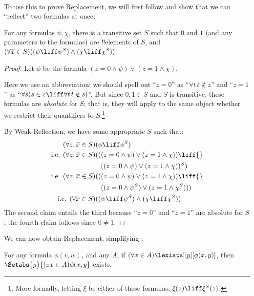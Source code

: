 \documentclass[../../../include/open-logic-section]{subfiles}
\begin{document}
\
\\
To use this to prove Replacement, we will first follow \citet[first
part of Theorem 2]{Levy1960} and show that we can ``reflect'' two
formulas at once:

\begin{lem}[in $\Z + \text{Weak-Reflection}$.]
For any formulas $\psi, \chi$, there is a transitive set $S$ such that $0$ and $1$ (and any parameters to the formulas) are !!{element}s of $S$, and $(\forall \overline{x} \in S)((\psi \liff \psi^S) \land (\chi \liff \chi^S))$.
\end{lem}

\begin{proof}
Let $\phi$ be the formula $(z = 0 \land \psi) \lor (z = 1 \land \chi)$. 

Here we use an abbreviation; we should spell out ``$z = 0$'' as
``$\forall t\, t \notin z$'' and ``$z =1$'' as ``$\forall s(s \in z
\liff \forall t\, t \notin s)$''. But since $0, 1 \in S$ and $S$ is
transitive, these formulas are \emph{absolute} for $S$; that is, they
will apply to the same object whether we restrict their quantifiers to
$S$.\footnote{More formally, letting $\xi$ be either of these
formulas, $\xi(z) \liff \xi^S(z)$.}

By Weak-Reflection, we have some appropriate $S$ such that:
\begin{align*}
	(\forall z, \overline{x} \in S)(&\phi \liff \phi^S)\\
	\text{i.e. }(\forall z, \overline{x} \in S)(&((z = 0 \land \psi) \lor (z = 1 \land \chi)) \liff {}\\
	&\phantom{(}((z = 0 \land \psi) \lor (z = 1 \land \chi))^S)\\
	\text{i.e. }(\forall z, \overline{x} \in S)(&((z = 0 \land \psi) \lor (z = 1 \land \chi))\liff {}\\
	&\phantom{(}((z = 0 \land \psi^S) \lor (z = 1 \land \chi^S)))\\
	\text{i.e. }(\forall \overline{x} \in S)(&(\psi \liff \psi^S) \land (\chi \liff \chi^S))
\end{align*}
The second claim entails the third because ``$z = 0$'' and ``$z=1$''
are absolute for $S$; the fourth claim follows since $0 \neq 1$.
\end{proof}\noindent We can now obtain Replacement, simplifying
\citet[Theorem 6]{Levy1960}:

\begin{thm}\label{thm:replacement} 
For any formula $\phi(v,w)$, and any $A$, if $(\forall x \in A)\lexists![y][\phi(x,y)]$, then
$\Setabs{y}{(\exists x \in A)\phi(x,y}$ exists.
\end{thm}
\end{document}
